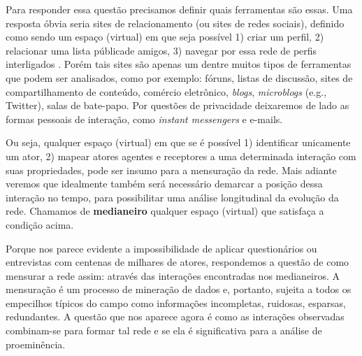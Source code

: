 Para responder essa questão precisamos definir quais ferramentas são essas. Uma
resposta óbvia seria sites de relacionamento (ou sites de redes sociais),
definido como sendo um espaço (virtual) em que seja possível 1) criar um perfil,
2) relacionar uma lista públicade amigos, 3) navegar por essa rede de perfis
interligados \citep{Boyd2007}. Porém tais sites são apenas um dentre muitos tipos
de ferramentas que podem ser analisados, como por exemplo: fóruns, listas de
discussão, sites de compartilhamento de conteúdo, comércio eletrônico,
\emph{blogs}, \emph{microblogs} (e.g., Twitter), salas de bate-papo. Por questões
de privacidade deixaremos de lado as formas pessoais de interação, como
\emph{instant messengers} e e-mails.

Ou seja, qualquer espaço (virtual) em que se é possível 1) identificar
unicamente um ator, 2) mapear atores agentes e receptores a uma determinada
interação com suas propriedades, pode ser insumo para a mensuração da rede. Mais
adiante veremos que idealmente também será necessário demarcar a posição dessa
interação no tempo, para possibilitar uma análise longitudinal da evolução da
rede. Chamamos de \textbf{medianeiro} qualquer espaço (virtual) que satisfaça a
condição acima.

Porque nos parece evidente a impossibilidade de aplicar questionários ou
entrevistas com centenas de milhares de atores, respondemos a questão de como
mensurar a rede assim: através das interações encontradas nos medianeiros. A
mensuração é um processo de mineração de dados e, portanto, sujeita a todos os
empecilhos típicos do campo como informações incompletas, ruidosas, esparsas,
redundantes. A questão que nos aparece agora é como as interações observadas
combinam-se para formar tal rede e se ela é significativa para a análise de
proeminência.